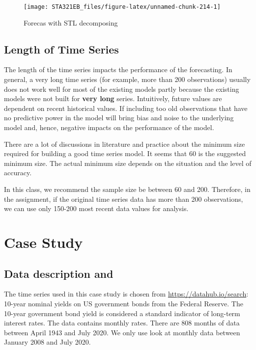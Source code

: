 \documentclass[
]{book}
\begin{document}
\begin{figure}

{\centering \texttt{[image: STA321EB\_files/figure-latex/unnamed-chunk-214-1]} 

}

\caption{Forecas with STL decomposing}\label{fig:unnamed-chunk-214}
\end{figure}

\hypertarget{length-of-time-series}{%
\subsection{Length of Time Series}\label{length-of-time-series}}

The length of the time series impacts the performance of the forecasting. In general, a very long time series (for example, more than 200 observations) usually does not work well for most of the existing models partly because the existing models were not built for \textbf{very long} series. Intuitively, future values are dependent on recent historical values. If including too old observations that have no predictive power in the model will bring bias and noise to the underlying model and, hence, negative impacts on the performance of the model.

There are a lot of discussions in literature and practice about the minimum size required for building a good time series model. It seems that 60 is the suggested minimum size. The actual minimum size depends on the situation and the level of accuracy.

In this class, we recommend the sample size be between 60 and 200. Therefore, in the assignment, if the original time series data has more than 200 observations, we can use only 150-200 most recent data values for analysis.

\hypertarget{case-study-2}{%
\section{Case Study}\label{case-study-2}}

\hypertarget{data-description-and}{%
\subsection{Data description and}\label{data-description-and}}

The time series used in this case study is chosen from \url{https://datahub.io/search}: 10-year nominal yields on US government bonds from the Federal Reserve. The 10-year government bond yield is considered a standard indicator of long-term interest rates. The data contains monthly rates. There are 808 months of data between April 1943 and July 2020. We only use look at monthly data between January 2008 and July 2020.
\end{document}
